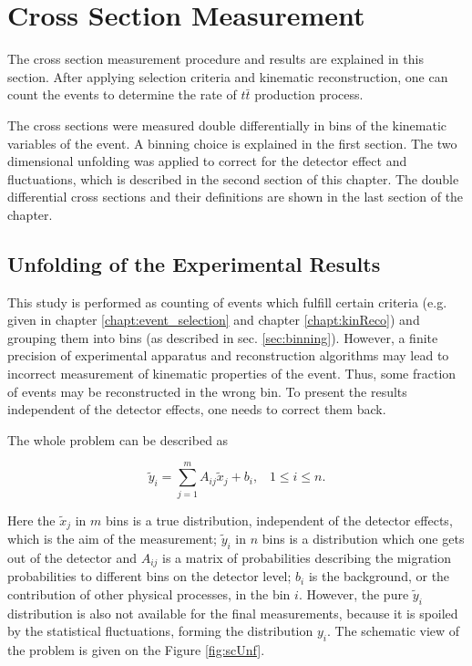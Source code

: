 \chapter{Cross Section Measurement}

The cross section measurement procedure and results are explained in this section.
After applying selection criteria and kinematic reconstruction, one can count the events to determine
the rate of $t\bar{t}$ production process.

The cross sections were measured double differentially in bins of the kinematic variables of the event.
A binning choice is explained in the first section.
The two dimensional unfolding was applied to correct for the detector effect and fluctuations, which is described
in the second section of this chapter.
The double differential cross sections and their definitions are shown in the last section of the chapter.

\section{Unfolding of the Experimental Results}\label{sec:unfold}

This study is performed as counting of events which fulfill certain criteria (e.g. given in chapter \ref{chapt:event_selection} and 
chapter \ref{chapt:kinReco}) and grouping them into bins (as described in sec. \ref{sec:binning}). However, a finite precision
of experimental apparatus and reconstruction algorithms may lead to incorrect measurement of kinematic properties of the event.
Thus, some fraction of events may be reconstructed in the wrong bin. To present the results independent of the detector effects,
one needs to correct them back.

The whole problem can be described as

\begin{equation}\label{eq:UnfoldProb}
 \tilde{y}_i = \sum_{j = 1}^{m} A_{ij}\tilde{x}_{j} + b_{i}, \;\;\; 1 \leq i \leq n.
\end{equation}

Here the $\tilde{x}_j$ in $m$ bins is a true distribution, independent of the detector effects, which is the aim of the measurement;
$\tilde{y}_i$ in $n$ bins is a distribution which one gets out of the detector and $A_{ij}$ is a matrix of probabilities describing 
the migration probabilities to different bins on the detector level; $b_{i}$ is the background, or the contribution of other physical
processes, in the bin $i$. However, the pure $\tilde{y}_{i}$ distribution is also not available for the final measurements, because it is
spoiled by the statistical fluctuations, forming the distribution $y_{i}$. The schematic view of the problem is given on the Figure \ref{fig:scUnf}.


